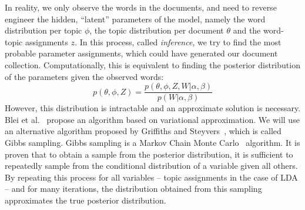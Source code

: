 \documentclass[
        a4paper,
        titlepage,
        twoside,
        parskip
        ]{scrbook}
\theoremstyle{break}
\begin{document}
In reality, we only observe the words in the documents, and need to reverse engineer the hidden, ``latent'' parameters of the model, namely the word distribution per topic $\phi$, the topic distribution per document $\theta$ and the word-topic assignments $z$.
In this process, called \emph{inference}, we try to find the most probable parameter assignments, which could have generated our document collection.
Computationally, this is equivalent to finding the posterior distribution of the parameters given the observed words:
\begin{equation*}
  p(\theta, \phi, Z) = \frac{p(\theta, \phi, Z, W | \alpha, \beta)}{p(W|\alpha, \beta)}
\end{equation*}
However, this distribution is intractable and an approximate solution is necessary.
Blei et al.~\cite{Blei2003} propose an algorithm based on variational approximation.
We will use an alternative algorithm proposed by Griffiths and Steyvers~\cite{Griffiths2004}, which is called Gibbs sampling.
Gibbs sampling is a Markov Chain Monte Carlo~\cite{Gilks1996} algorithm.
It is proven that to obtain a sample from the posterior distribution, it is sufficient to repeatedly sample from the conditional distribution of a variable given all others.
By repeating this process for all variables -- topic assignments in the case of LDA -- and for many iterations, the distribution obtained from this sampling approximates the true posterior distribution.
\end{document}
